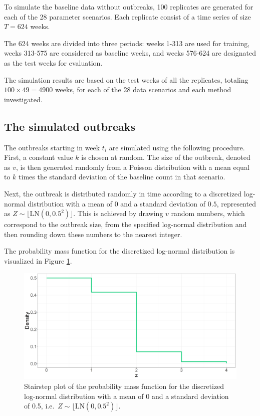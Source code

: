 \documentclass[preprint, 3p, authoryear]{elsarticle} %
\begin{document}
To simulate the baseline data without outbreaks, 100 replicates are generated for each of the 28 parameter scenarios. Each replicate consist of a time series of size \(T=624\) weeks.

The 624 weeks are divided into three periods: weeks 1-313 are used for training, weeks 313-575 are considered as baseline weeks, and weeks 576-624 are designated as the test weeks for evaluation.

The simulation results are based on the test weeks of all the replicates, totaling \(100\times 49=4900\) weeks, for each of the 28 data scenarios and each method investigated.

\hypertarget{the-simulated-outbreaks}{%
\subsection{The simulated outbreaks}\label{the-simulated-outbreaks}}

The outbreaks starting in week \(t_i\) are simulated using the following procedure. First, a constant value \(k\) is chosen at random. The size of the outbreak, denoted as \(v\), is then generated randomly from a Poisson distribution with a mean equal to \(k\) times the standard deviation of the baseline count in that scenario.

Next, the outbreak is distributed randomly in time according to a discretized log-normal distribution with a mean of \(0\) and a standard deviation of \(0.5\), represented as \(Z \sim \lfloor \mathrm{LN}(0,0.5^2)\rfloor\). This is achieved by drawing \(v\) random numbers, which correspond to the outbreak size, from the specified log-normal distribution and then rounding down these numbers to the nearest integer.

The probability mass function for the discretized log-normal distribution is visualized in Figure \ref{fig:PDFLogNormal}.



\begin{figure}[H]
\includegraphics[width=1\linewidth]{../../figures/PDFLogNormal} \caption{Stairstep plot of the probability mass function for the discretized log-normal distribution with a mean of 0 and a standard deviation of 0.5, i.e.~\(Z \sim \lfloor \mathrm{LN}(0,0.5^2)\rfloor\).}\label{fig:PDFLogNormal}
\end{figure}
\end{document}
